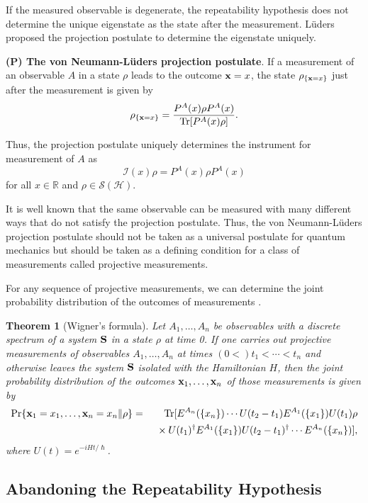 \documentclass[graybox]{svmult}
\newcommand{\beq}{\begin{equation}}
\newcommand{\eeq}{\end{equation}}
\newcommand{\beqa}{\begin{eqnarray}}
\newcommand{\eeqa}{\end{eqnarray}}
\newcommand{\bS}{{\bf S}}
\newcommand{\cH}{{\mathcal H}}
\newcommand{\cI}{{\mathcal I}}
\newcommand{\cS}{{\mathcal S}}
\newcommand{\da}{\dagger}
\newcommand{\nn}{\nonumber}
\newcommand{\rh}{\rho}
\newcommand{\Tr}{\mbox{\rm Tr}}
\newcommand{\bx}{{\bf x}}
\newtheorem{Theorem}{Theorem}
\newcommand{\R}{\mathbb{R}}
\begin{document}
If the measured observable is degenerate, the repeatability hypothesis 
does not determine the unique eigenstate as the state after the measurement.
L\"{u}ders \cite{Lud51} proposed the projection postulate to determine
the eigenstate uniquely.
\bigskip

 {\bf  (P) The von Neumann-L\"{u}ders projection postulate}.
 If a measurement of an observable $A$ in a state 
$\rh$ leads to the outcome $\bx=x$, the state  $\rh_{\{\bx=x\}}$  just after the measurement is given by
\beqa
\rh_{\{\bx=x\}}=\frac{P^{A}(x)\rh P^{A}(x)}{\Tr[P^{A}(x)\rh]}.
\eeqa
\bigskip

Thus, the projection postulate uniquely determines the instrument for
measurement of $A$ as
\beq
\cI(x)\rh=P^{A}(x)\rh P^{A}(x)
\eeq
for all $x\in\R$ and $\rh\in\cS(\cH)$.

It is well known that the same observable can be measured with many different ways
that do not satisfy the projection postulate.  Thus, the von Neumann-L\"{u}ders projection 
postulate should not be taken as a universal postulate for quantum mechanics 
but should be taken as a defining condition for a class of measurements called projective measurements.

For any sequence of projective measurements, we can determine the joint probability distribution 
of the outcomes of measurements \cite{Wig63+}.

\begin{Theorem}[Wigner's formula]
Let $A_{1},\ldots,A_{n}$ be observables with a discrete spectrum
of a system $\bS$ in a state $\rh$ at time 0.
If one carries out projective measurements 
of observables $A_{1},\ldots,A_{n}$ at times 
$(0<)t_{1}<\cdots<t_{n}$ and otherwise leaves the system $\bS$ isolated
with the Hamiltonian $H$,
then the joint probability distribution of the outcomes 
$\bx_{1},\ldots,\bx_{n}$ of those measurements is given by
\beqa
\Pr\{\bx_{1}=x_{1},\ldots,\bx_{n}= x_{n}\|\rh\}
&=&
\Tr[E^{A_{n}}(\{x_{n}\})\cdots U(t_{2}-t_{1})E^{A_{1}}(\{x_{1}\})U(t_{1})\rh\nn
\\
& &\mbox{ }\times
U(t_{1})^{\da}E^{A_{1}}(\{x_{1}\})U(t_{2}-t_{1})^{\da}
\cdots E^{A_{n}}(\{x_{n}\})],\nn\\
\eeqa
where $U(t)=e^{-iHt/\hslash}$.
\end{Theorem}


\subsection{Abandoning the Repeatability Hypothesis}
\label{se:ABRH}
\end{document}
